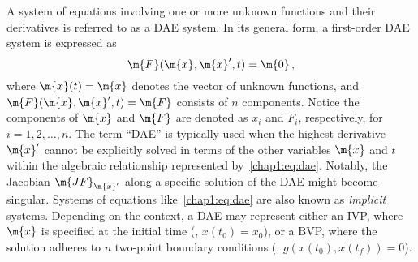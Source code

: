 A system of equations involving one or more unknown functions and their derivatives is referred to as a \ac{DAE} system. In its general form, a first-order \ac{DAE} system is expressed as
%
\begin{equation}
  \m{F}(\m{x}, \m{x}^{\prime}, t) = \m{0} \, \text{,}
  \label{chap1:eq:dae}
\end{equation}
%
where $\m{x}(t) = \m{x}$ denotes the vector of unknown functions, and $\m{F}(\m{x}, \m{x}^{\prime}, t) = \m{F}$ consists of $n$ components. Notice the components of $\m{x}$ and $\m{F}$ are denoted as $x_i$ and $F_i$, respectively, for $i = 1, 2, \dots, n$. The term ``\ac{DAE}'' is typically used when the highest derivative $\m{x}^{\prime}$ cannot be explicitly solved in terms of the other variables $\m{x}$ and $t$ within the algebraic relationship represented by~\eqref{chap1:eq:dae}. Notably, the Jacobian $\m{JF}_{\m{x}^{\prime}}$ along a specific solution of the \ac{DAE} might become singular. Systems of equations like~\eqref{chap1:eq:dae} are also known as \emph{implicit} systems. Depending on the context, a \ac{DAE} may represent either an \ac{IVP}, where $\m{x}$ is specified at the initial time (\eg{}, $x(t_0) = x_0$), or a \ac{BVP}, where the solution adheres to $n$ two-point boundary conditions (\eg{}, $g(x(t_0), x(t_f)) = 0$).

